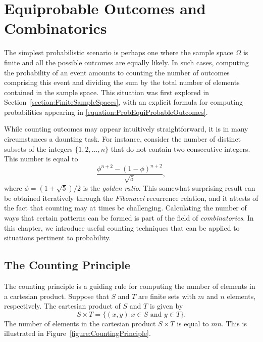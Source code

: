 \chapter[Equiprobable Outcomes]{Equiprobable Outcomes and Combinatorics}

The simplest probabilistic scenario is perhaps one where the sample space $\Omega$ is finite and all the possible outcomes are equally likely.
In such cases, computing the probability of an event amounts to counting the number of outcomes comprising this event and dividing the sum by the total number of elements contained in the sample space.
This situation was first explored in Section~\ref{section:FiniteSampleSpaces}, with an explicit formula for computing probabilities appearing in \eqref{equation:ProbEquiProbableOutcomes}.

While counting outcomes may appear intuitively straightforward, it is in many circumstances a daunting task.
For instance, consider the number of distinct subsets of the integers $\{ 1, 2, \ldots, n \}$ that do not contain two consecutive integers.
This number is equal to
\begin{equation*}
\frac{ \phi^{n+2} - (1 - \phi)^{n+2} }{ \sqrt{5} } ,
\end{equation*}
where $\phi = (1 + \sqrt{5}) / 2$ is the \emph{golden ratio}.
This somewhat surprising result can be obtained iteratively through the \emph{Fibonacci} recurrence relation, and it attests of the fact that counting may at times be challenging.
Calculating the number of ways that certain patterns can be formed is part of the field of \emph{combinatorics}. 
In this chapter, we introduce useful counting techniques that can be applied to situations pertinent to probability.


\section{The Counting Principle}

The counting principle is a guiding rule for computing the number of elements in a cartesian product.
Suppose that $S$ and $T$ are finite sets with $m$ and $n$ elements, respectively.
The cartesian product of $S$ and $T$ is given by
\begin{equation*}
S \times T = \{ (x, y) | x \in S \text{ and } y \in T \} .
\end{equation*}
The number of elements in the cartesian product $S \times T$ is equal to $m n$.
This is illustrated in Figure~\ref{figure:CountingPrinciple}.


